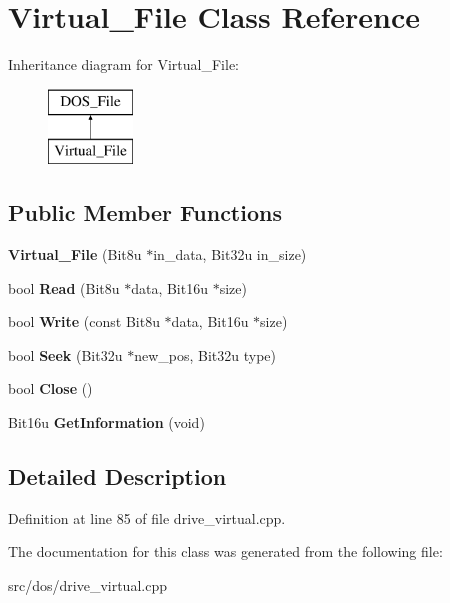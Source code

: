 \hypertarget{classVirtual__File}{\section{Virtual\-\_\-\-File Class Reference}
\label{classVirtual__File}
}
Inheritance diagram for Virtual\-\_\-\-File\-:\begin{figure}[H]
\begin{center}
\leavevmode
\includegraphics[height=2.000000cm]{classVirtual__File}
\end{center}
\end{figure}
\subsection*{Public Member Functions}
\begin{DoxyCompactItemize}
\item 
\hypertarget{classVirtual__File_a2cf61d572fa71337faaeb7df7392f317}{{\bfseries Virtual\-\_\-\-File} (Bit8u $\ast$in\-\_\-data, Bit32u in\-\_\-size)}\label{classVirtual__File_a2cf61d572fa71337faaeb7df7392f317}

\item 
\hypertarget{classVirtual__File_a1f0a1653d27e085f08eb73d6be4e1613}{bool {\bfseries Read} (Bit8u $\ast$data, Bit16u $\ast$size)}\label{classVirtual__File_a1f0a1653d27e085f08eb73d6be4e1613}

\item 
\hypertarget{classVirtual__File_a22399c468ba3dc00cec903a6620db56e}{bool {\bfseries Write} (const Bit8u $\ast$data, Bit16u $\ast$size)}\label{classVirtual__File_a22399c468ba3dc00cec903a6620db56e}

\item 
\hypertarget{classVirtual__File_ac9de7c9ede790bf1ef9ddbe722844c03}{bool {\bfseries Seek} (Bit32u $\ast$new\-\_\-pos, Bit32u type)}\label{classVirtual__File_ac9de7c9ede790bf1ef9ddbe722844c03}

\item 
\hypertarget{classVirtual__File_a75f40f36a91d8ba716cf9d9b60bd4454}{bool {\bfseries Close} ()}\label{classVirtual__File_a75f40f36a91d8ba716cf9d9b60bd4454}

\item 
\hypertarget{classVirtual__File_a32799e96fbb1e161825303ad7ffb2a16}{Bit16u {\bfseries Get\-Information} (void)}\label{classVirtual__File_a32799e96fbb1e161825303ad7ffb2a16}

\end{DoxyCompactItemize}


\subsection{Detailed Description}


Definition at line 85 of file drive\-\_\-virtual.\-cpp.



The documentation for this class was generated from the following file\-:\begin{DoxyCompactItemize}
\item 
src/dos/drive\-\_\-virtual.\-cpp\end{DoxyCompactItemize}
